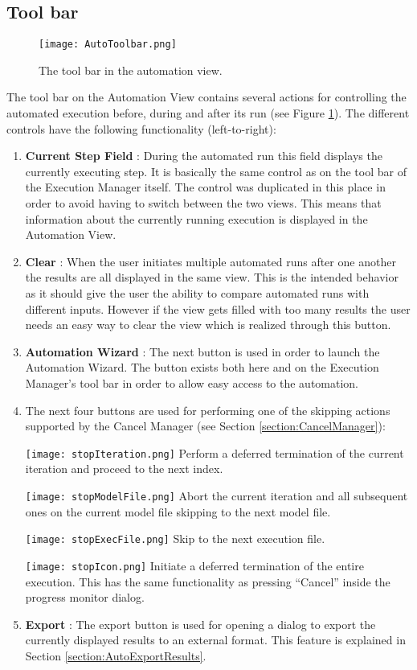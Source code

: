 \subsection{Tool bar}
\label{section:AutoToolbar}
\begin{figure}
  \centering
  \texttt{[image: AutoToolbar.png]}
  \caption[The tool bar in the automation view.]%
  {The tool bar in the automation view.\protect}
  \label{fig:AutoToolbar}
\end{figure}
The tool bar on the Automation View contains several actions for controlling the automated 
execution before, during and after its run (see Figure \ref{fig:AutoToolbar}).
The different controls have the following functionality (left-to-right):
\begin{enumerate}
 \item \textbf{Current Step Field} : During the automated run this field displays the
currently executing step. It is basically the same control as on the tool bar of the 
Execution Manager itself. The control was duplicated in this place in order to avoid
having to switch between the two views. This means that information about the currently
running execution is displayed in the Automation View.
 \item \textbf{Clear} : When the user initiates multiple automated runs after one another
the results are all displayed in the same view. This is the intended behavior as it should 
give the user the ability to compare automated runs with different inputs. However if the 
view gets filled with too many results the user needs an easy way to clear the view which
is realized through this button.
 \item \textbf{Automation Wizard} : The next button is used in order to launch the 
Automation Wizard. The button exists both here and on the Execution Manager's tool bar
in order to allow easy access to the automation.
 \item The next four buttons are used for performing one of the skipping actions supported
by the Cancel Manager (see Section \ref{section:CancelManager}):

\texttt{[image: stopIteration.png]} Perform a deferred termination of the current 
iteration and proceed to the next index.

\texttt{[image: stopModelFile.png]} Abort the current iteration and all subsequent ones on the 
current model file skipping to the next model file.

\texttt{[image: stopExecFile.png]} Skip to the next execution file.

\texttt{[image: stopIcon.png]} Initiate a deferred termination of the entire execution. 
This has the same functionality as pressing ``Cancel'' inside the 
progress monitor dialog.

 \item \textbf{Export} : The export button is used for opening a dialog to export the currently displayed
results to an external format. This feature is explained in Section \ref{section:AutoExportResults}.
\end{enumerate}


